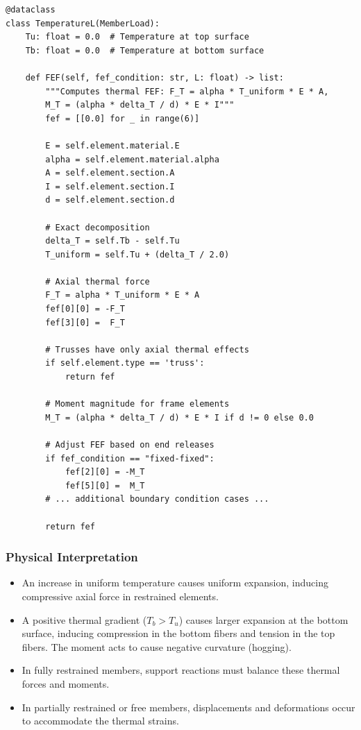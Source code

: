 \documentclass[12pt,a4paper]{article}
\begin{document}
\begin{lstlisting}[caption=Thermal Load FEF Decomposition (parser.py), label=lst:temperature_fef, basicstyle=\ttfamily\small]
@dataclass
class TemperatureL(MemberLoad):
    Tu: float = 0.0  # Temperature at top surface
    Tb: float = 0.0  # Temperature at bottom surface

    def FEF(self, fef_condition: str, L: float) -> list:
        """Computes thermal FEF: F_T = alpha * T_uniform * E * A,
        M_T = (alpha * delta_T / d) * E * I"""
        fef = [[0.0] for _ in range(6)]
        
        E = self.element.material.E
        alpha = self.element.material.alpha
        A = self.element.section.A
        I = self.element.section.I
        d = self.element.section.d
        
        # Exact decomposition
        delta_T = self.Tb - self.Tu
        T_uniform = self.Tu + (delta_T / 2.0)
        
        # Axial thermal force
        F_T = alpha * T_uniform * E * A
        fef[0][0] = -F_T
        fef[3][0] =  F_T
        
        # Trusses have only axial thermal effects
        if self.element.type == 'truss':
            return fef
        
        # Moment magnitude for frame elements
        M_T = (alpha * delta_T / d) * E * I if d != 0 else 0.0
        
        # Adjust FEF based on end releases
        if fef_condition == "fixed-fixed":
            fef[2][0] = -M_T
            fef[5][0] =  M_T
        # ... additional boundary condition cases ...
        
        return fef
\end{lstlisting}

\subsubsection{Physical Interpretation}

\begin{itemize}
    \item An increase in uniform temperature causes uniform expansion, inducing compressive axial force in restrained elements.
    \item A positive thermal gradient ($T_b > T_u$) causes larger expansion at the bottom surface, inducing compression in the bottom fibers and tension in the top fibers. The moment acts to cause negative curvature (hogging).
    \item In fully restrained members, support reactions must balance these thermal forces and moments.
    \item In partially restrained or free members, displacements and deformations occur to accommodate the thermal strains.
\end{itemize}
\end{document}
